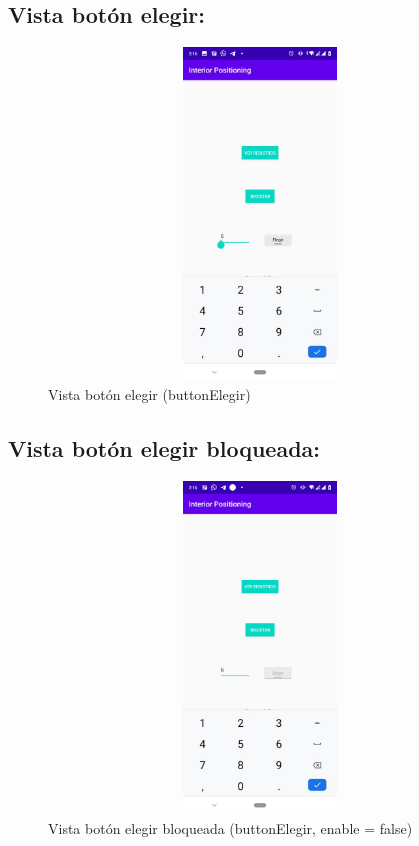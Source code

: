 \documentclass[conference,compsoc,onecolumn]{IEEEtran}
\begin{document}
\subsection{Vista botón elegir:}
\begin{figure}[H]
\centering
\includegraphics[keepaspectratio, width=400pt ,height=250pt]{Imagenes/imagen12.jpeg}
\caption{Vista botón elegir (buttonElegir)}
\end{figure}
\enskip
\subsection{Vista botón elegir bloqueada:}
\begin{figure}[H]
\centering
\includegraphics[keepaspectratio, width=400pt ,height=250pt]{Imagenes/imagen13.jpeg}
\caption{Vista botón elegir bloqueada (buttonElegir, enable = false)}
\end{figure}
\end{document}
